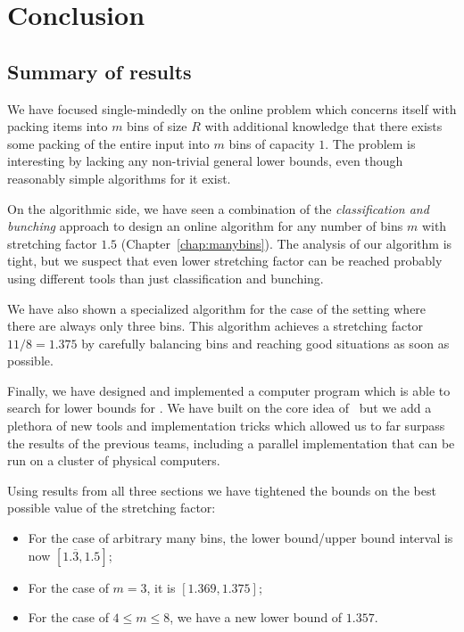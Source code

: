 \chapter{Conclusion}\label{chap:conclusion}

\section{Summary of results}

We have focused single-mindedly on the online problem \binstretch
which concerns itself with packing items into $m$ bins of size $R$
with additional knowledge that there exists some packing of the entire
input into $m$ bins of capacity $1$. The problem is interesting by
lacking any non-trivial general lower bounds, even though reasonably
simple algorithms for it exist.

On the algorithmic side, we have seen a combination of the
\emph{classification and bunching} approach to design an online
algorithm for any number of bins $m$ with stretching factor $1.5$
(Chapter~\ref{chap:manybins}).  The analysis of our algorithm is
tight, but we suspect that even lower stretching factor can be reached
probably using different tools than just classification and bunching.

We have also shown a specialized algorithm for the case of the setting
where there are always only three bins. This algorithm achieves a
stretching factor $11/8 = 1.375$ by carefully balancing bins and
reaching good situations as soon as possible.

Finally, we have designed and implemented a computer program which is
able to search for lower bounds for \binstretch. We have built on the
core idea of~\cite{gabay2013lbv2} but we add a plethora of new tools
and implementation tricks which allowed us to far surpass the results
of the previous teams, including a parallel implementation that can be
run on a cluster of physical computers.

Using results from all three sections we have tightened the bounds on
the best possible value of the stretching factor:

\begin{itemize}
\item For the case of arbitrary many bins, the lower bound/upper bound interval is now $[1.\overline{3}, 1.5]$; 
\item For the case of $m = 3$, it is $[1.369, 1.375]$;
\item For the case of $4 \le m \le 8$, we have a new lower bound of $1.357$.
\end{itemize}

